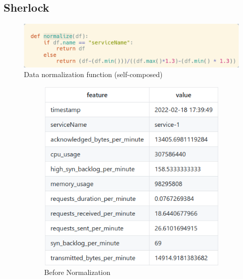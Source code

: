 \subsection{Sherlock}

\begin{figure}[H]
    \includegraphics[width=14cm]{assets/implementation/normalize-data.png}
    \caption{Data normalization function (self-composed)}
    \label{fig:normalize-data}
\end{figure}


\begin{figure}[H]
    \centering
    \begin{subfigure}[b]{0.48\textwidth}
        \centering
        \includegraphics[width=\textwidth]{assets/implementation/before-normalization.png}
        \caption{Before Normalization}
        \label{fig:before-normalization}
    \end{subfigure}
    \hfill
    \begin{subfigure}[b]{0.49\textwidth}
        \centering

\end{subfigure}
\end{figure}
